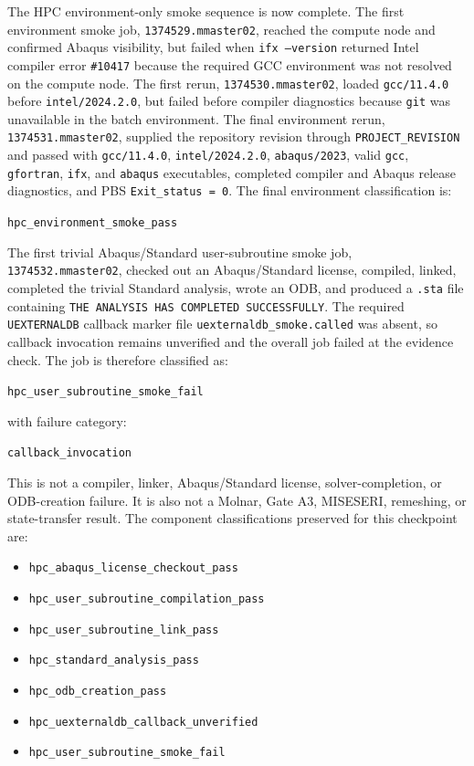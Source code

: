 \documentclass[11pt,a4paper]{article}
\begin{document}
The HPC environment-only smoke sequence is now complete. The first environment smoke job, \texttt{1374529.mmaster02}, reached the compute node and confirmed Abaqus visibility, but failed when \texttt{ifx --version} returned Intel compiler error \texttt{\#10417} because the required GCC environment was not resolved on the compute node. The first rerun, \texttt{1374530.mmaster02}, loaded \texttt{gcc/11.4.0} before \texttt{intel/2024.2.0}, but failed before compiler diagnostics because \texttt{git} was unavailable in the batch environment. The final environment rerun, \texttt{1374531.mmaster02}, supplied the repository revision through \texttt{PROJECT\_REVISION} and passed with \texttt{gcc/11.4.0}, \texttt{intel/2024.2.0}, \texttt{abaqus/2023}, valid \texttt{gcc}, \texttt{gfortran}, \texttt{ifx}, and \texttt{abaqus} executables, completed compiler and Abaqus release diagnostics, and PBS \texttt{Exit\_status = 0}. The final environment classification is:

\begin{center}
\texttt{hpc\_environment\_smoke\_pass}
\end{center}

The first trivial Abaqus/Standard user-subroutine smoke job, \texttt{1374532.mmaster02}, checked out an Abaqus/Standard license, compiled, linked, completed the trivial Standard analysis, wrote an ODB, and produced a \texttt{.sta} file containing \texttt{THE ANALYSIS HAS COMPLETED SUCCESSFULLY}. The required \texttt{UEXTERNALDB} callback marker file \texttt{uexternaldb\_smoke.called} was absent, so callback invocation remains unverified and the overall job failed at the evidence check. The job is therefore classified as:

\begin{center}
\texttt{hpc\_user\_subroutine\_smoke\_fail}
\end{center}

with failure category:

\begin{center}
\texttt{callback\_invocation}
\end{center}

This is not a compiler, linker, Abaqus/Standard license, solver-completion, or ODB-creation failure. It is also not a Molnar, Gate A3, MISESERI, remeshing, or state-transfer result. The component classifications preserved for this checkpoint are:

\begin{itemize}
  \item \texttt{hpc\_abaqus\_license\_checkout\_pass}
  \item \texttt{hpc\_user\_subroutine\_compilation\_pass}
  \item \texttt{hpc\_user\_subroutine\_link\_pass}
  \item \texttt{hpc\_standard\_analysis\_pass}
  \item \texttt{hpc\_odb\_creation\_pass}
  \item \texttt{hpc\_uexternaldb\_callback\_unverified}
  \item \texttt{hpc\_user\_subroutine\_smoke\_fail}
\end{itemize}
\end{document}
